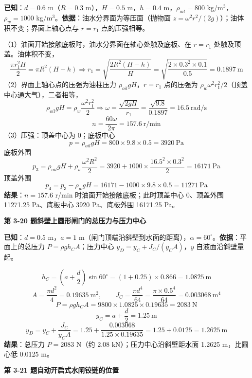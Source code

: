 \begin{jie}
\textbf{已知}：$d=0.6$ m（$R=0.3$ m），$H=0.5$ m，$h=0.4$ m，$\rho_{oil}=800$ kg/m$^3$，$\rho_w=1000$ kg/m$^3$。\textbf{依据}：油水分界面为等压面（抛物面 $z=\omega^2r^2/(2g)$）；油体积不变；界面上轴心点与 $r=r_1$ 点的压强相等。

（1）油面开始接触底板时，油水分界面在轴心处触及底板、在 $r=r_1$ 处触及顶盖。油体积不变，
\[ \frac{\pi r_1^2H}{2}=\pi R^2(H-h)\Rightarrow r_1=\sqrt{\frac{2R^2(H-h)}{H}}=\sqrt{\frac{2\times0.3^2\times0.1}{0.5}}=0.1897\ \mathrm{m} \]
（2）界面上轴心点的压强为油柱压力 $\rho_{oil}gH$，$r=r_1$ 点的压强为 $\rho_w\omega^2r_1^2/2$（顶盖中心通大气），二者相等，
\[ \rho_{oil}gH=\rho_w\frac{\omega^2r_1^2}{2}\Rightarrow\omega=\frac{\sqrt{2gH}}{r_1}=\frac{\sqrt{9.8}}{0.1897}=16.5\ \mathrm{rad/s} \]
\[ n=\frac{60\omega}{2\pi}=157.6\ \mathrm{r/min} \]
（3）压强：顶盖中心为 0；底板中心
\[ p=\rho_{oil}gH=800\times9.8\times0.5=3920\ \mathrm{Pa} \]
底板外围
\[ p_3=\rho_{oil}gH+\rho_w\frac{\omega^2R^2}{2}=3920+1000\times\frac{16.5^2\times0.3^2}{2}=16171\ \mathrm{Pa} \]
顶盖外围
\[ p_4=p_3-\rho_w gH=16171-1000\times9.8\times0.5=11271\ \mathrm{Pa} \]
\textbf{结果}：$n=157.6$ r/min 时油面开始接触底板；此时顶盖中心 0、顶盖外围 11271.25 Pa、底板中心 3920 Pa、底板外围 16171.25 Pa。
\end{jie}

\noindent\textbf{第 3-20 题\quad 斜壁上圆形闸门的总压力与压力中心}

\begin{jie}
\textbf{已知}：$d=0.5$ m，$a=1$ m（闸门顶端沿斜壁到水面的距离），$\alpha=60^\circ$。\textbf{依据}：平面上的总压力 $P=\rho gh_CA$；压力中心 $y_D=y_C+J_C/(y_CA)$，$y$ 自液面沿斜壁量起。

\[ h_C=\left(a+\frac{d}{2}\right)\sin60^\circ=(1+0.25)\times0.866=1.0825\ \mathrm{m} \]
\[ A=\frac{\pi d^2}{4}=0.19635\ \mathrm{m^2},\qquad J_C=\frac{\pi d^4}{64}=\frac{\pi\times0.5^4}{64}=0.003068\ \mathrm{m^4} \]
\[ P=\rho gh_CA=9800\times1.0825\times0.19635=2083\ \mathrm{N} \]
\[ y_C=a+\frac{d}{2}=1.25\ \mathrm{m} \]
\[ y_D=y_C+\frac{J_C}{y_CA}=1.25+\frac{0.003068}{1.25\times0.19635}=1.25+0.0125=1.2625\ \mathrm{m} \]
\textbf{结果}：总压力 $P=2083$ N（约 2.08 kN）；压力中心沿斜壁距水面 1.2625 m，比圆心低 0.0125 m。
\end{jie}

\noindent\textbf{第 3-21 题\quad 自动开启式水闸铰链的位置}

